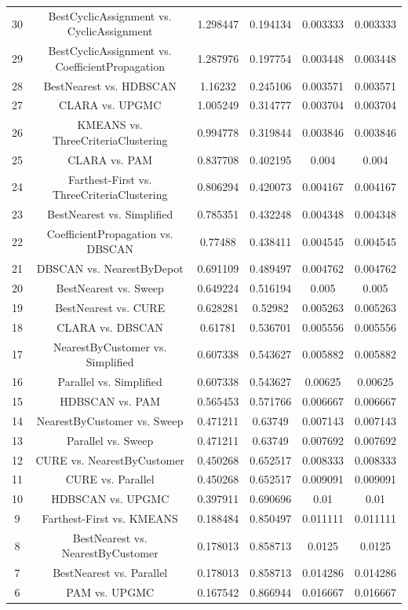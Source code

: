 \documentclass[a4paper,10pt]{article}
\begin{document}
\begin{landscape}
\begin{table}[!htp]
\begin{tabular}{cccccc}
30&BestCyclicAssignment vs. CyclicAssignment&1.298447&0.194134&0.003333&0.003333\\
29&BestCyclicAssignment vs. CoefficientPropagation&1.287976&0.197754&0.003448&0.003448\\
28&BestNearest vs. HDBSCAN&1.16232&0.245106&0.003571&0.003571\\
27&CLARA vs. UPGMC&1.005249&0.314777&0.003704&0.003704\\
26&KMEANS vs. ThreeCriteriaClustering&0.994778&0.319844&0.003846&0.003846\\
25&CLARA vs. PAM&0.837708&0.402195&0.004&0.004\\
24&Farthest-First vs. ThreeCriteriaClustering&0.806294&0.420073&0.004167&0.004167\\
23&BestNearest vs. Simplified&0.785351&0.432248&0.004348&0.004348\\
22&CoefficientPropagation vs. DBSCAN&0.77488&0.438411&0.004545&0.004545\\
21&DBSCAN vs. NearestByDepot&0.691109&0.489497&0.004762&0.004762\\
20&BestNearest vs. Sweep&0.649224&0.516194&0.005&0.005\\
19&BestNearest vs. CURE&0.628281&0.52982&0.005263&0.005263\\
18&CLARA vs. DBSCAN&0.61781&0.536701&0.005556&0.005556\\
17&NearestByCustomer vs. Simplified&0.607338&0.543627&0.005882&0.005882\\
16&Parallel vs. Simplified&0.607338&0.543627&0.00625&0.00625\\
15&HDBSCAN vs. PAM&0.565453&0.571766&0.006667&0.006667\\
14&NearestByCustomer vs. Sweep&0.471211&0.63749&0.007143&0.007143\\
13&Parallel vs. Sweep&0.471211&0.63749&0.007692&0.007692\\
12&CURE vs. NearestByCustomer&0.450268&0.652517&0.008333&0.008333\\
11&CURE vs. Parallel&0.450268&0.652517&0.009091&0.009091\\
10&HDBSCAN vs. UPGMC&0.397911&0.690696&0.01&0.01\\
9&Farthest-First vs. KMEANS&0.188484&0.850497&0.011111&0.011111\\
8&BestNearest vs. NearestByCustomer&0.178013&0.858713&0.0125&0.0125\\
7&BestNearest vs. Parallel&0.178013&0.858713&0.014286&0.014286\\
6&PAM vs. UPGMC&0.167542&0.866944&0.016667&0.016667\\

\end{tabular}
\end{table}
\end{landscape}
\end{document}
